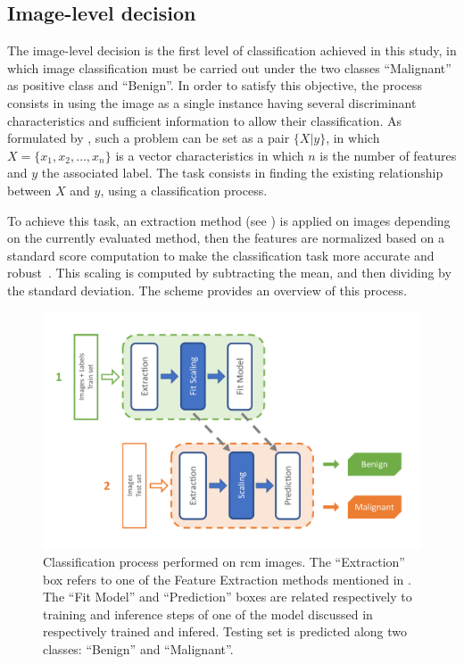 \documentclass[journal,article,submit,moreauthors,pdftex, applsci]{Definitions/mdpi}
\begin{document}
\subsection{Image-level decision}
\label{sec:image_decision}
The image-level decision is the first level of classification achieved in this study, in which image classification must be carried out under the two classes “Malignant” as positive class and “Benign”. In order to satisfy this objective, the process consists in using the image as a single instance having several discriminant characteristics and sufficient information to allow their classification. As formulated by \cite{foulds_frank_2010}, such a problem can be set as a pair \(\{X|y\}\), 
in which \(X=\{x_1,x_2,\ldots,x_n\}\) is a vector characteristics in which \(n\) is the number of features and \(y\) the associated label. The task consists in finding the existing relationship between \(X\) and \(y\), using a classification process.\par 
To achieve this task, an extraction method (see ) is applied on images depending on the currently evaluated method, then the features are normalized based on a standard score computation to make the classification task more accurate and robust~\cite{Graf2001}. This scaling is computed by subtracting the mean, and then dividing by the standard deviation. The  scheme provides an overview of this process.\par
\begin{figure}[h]
    \begin{center}
        \includegraphics[width=0.8\linewidth]{Figures/Process_Image.pdf}
        \caption{Classification process performed on \ac{rcm} images. The “Extraction” box refers to one of the Feature Extraction methods mentioned in . 
        The “Fit Model” and “Prediction” boxes are related respectively to training and inference steps of one of the model discussed in  respectively trained and infered. Testing set is predicted along two classes: “Benign” and “Malignant”.}
        \label{fig:image_process}
    \end{center} 
\end{figure}\par
\end{document}
